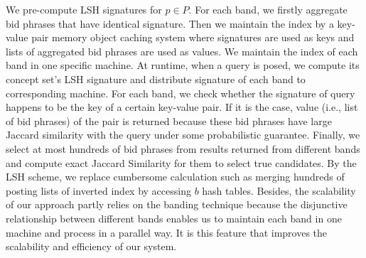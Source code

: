 We pre-compute LSH signatures for $p\in P$.%
For each band, we firstly aggregate bid phrases that have identical signature.
Then we maintain the index by a key-value pair memory object caching
system where signatures are used as keys and lists of
aggregated bid phrases are used as values.
We maintain the index of each band in one specific machine.
At runtime, when a query is posed, we compute its concept set's LSH
signature and distribute signature of each band to corresponding machine.
For each band, we check whether the signature of query happens to be
the key of a certain key-value pair.
If it is the case, value (i.e., list of bid phrases) of the pair is
returned because these bid phrases have large Jaccard similarity with
the query under some probabilistic guarantee.
Finally, we select at most hundreds of bid phrases from results
returned from different bands and compute exact Jaccard Similarity for
them to select true candidates.
By the LSH scheme, we replace cumbersome calculation such as merging
hundreds of posting lists of inverted index by %
accessing $b$ hash tables.
Besides, the scalability of our approach partly relies on the banding
technique because the disjunctive relationship between different bands enables
us to maintain each band in one machine and process in a parallel way.
It is this feature that improves the scalability and efficiency of our
system.

